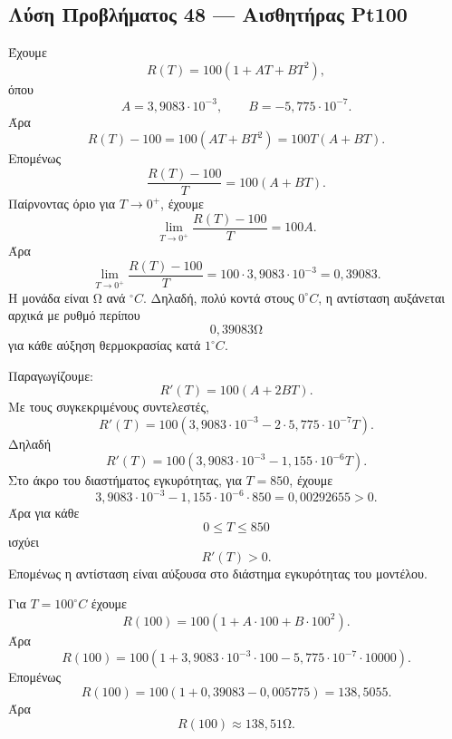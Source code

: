 \subsection*{Λύση Προβλήματος 48 --- Αισθητήρας Pt100}

\begin{alist}
  \item Έχουμε
        \[
          R(T)=100(1+AT+BT^2),
        \]
        όπου
        \[
          A=3{,}9083\cdot10^{-3},
          \qquad
          B=-5{,}775\cdot10^{-7}.
        \]
        Άρα
        \[
          R(T)-100
          =
          100(AT+BT^2)
          =
          100T(A+BT).
        \]
        Επομένως
        \[
          \frac{R(T)-100}{T}
          =
          100(A+BT).
        \]
        Παίρνοντας όριο για $T\to0^+$, έχουμε
        \[
          \lim_{T\to0^+}\frac{R(T)-100}{T}
          =
          100A.
        \]
        Άρα
        \[
          {
          \lim_{T\to0^+}\frac{R(T)-100}{T}
          =
          100\cdot3{,}9083\cdot10^{-3}
          =
          0{,}39083
          }.
        \]
        Η μονάδα είναι \(\si{\ohm}\) ανά \({}^\circ C\). Δηλαδή, πολύ
        κοντά στους \(0^\circ C\), η αντίσταση αυξάνεται αρχικά με ρυθμό
        περίπου
        \[
          0{,}39083\si{\ohm}
        \]
        για κάθε αύξηση θερμοκρασίας κατά \(1^\circ C\).

  \item Παραγωγίζουμε:
        \[
          R'(T)=100(A+2BT).
        \]
        Με τους συγκεκριμένους συντελεστές,
        \[
          R'(T)
          =
          100\left(3{,}9083\cdot10^{-3}
          -2\cdot5{,}775\cdot10^{-7}T\right).
        \]
        Δηλαδή
        \[
          R'(T)
          =
          100\left(3{,}9083\cdot10^{-3}
          -1{,}155\cdot10^{-6}T\right).
        \]
        Στο άκρο του διαστήματος εγκυρότητας, για $T=850$, έχουμε
        \[
          3{,}9083\cdot10^{-3}
          -1{,}155\cdot10^{-6}\cdot850
          =
          0{,}00292655>0.
        \]
        Άρα για κάθε
        \[
          0\leq T\leq850
        \]
        ισχύει
        \[
          R'(T)>0.
        \]
        Επομένως η αντίσταση είναι αύξουσα στο διάστημα εγκυρότητας
        του μοντέλου.

  \item Για \(T=100^\circ C\) έχουμε
        \[
          R(100)
          =
          100\left(1+A\cdot100+B\cdot100^2\right).
        \]
        Άρα
        \[
          R(100)
          =
          100\left(
          1+3{,}9083\cdot10^{-3}\cdot100
          -5{,}775\cdot10^{-7}\cdot10000
          \right).
        \]
        Επομένως
        \[
          R(100)
          =
          100(1+0{,}39083-0{,}005775)
          =
          138{,}5055.
        \]
        Άρα
        \[
          {R(100)\approx138{,}51\si{\ohm}}.
        \]


\end{alist}
